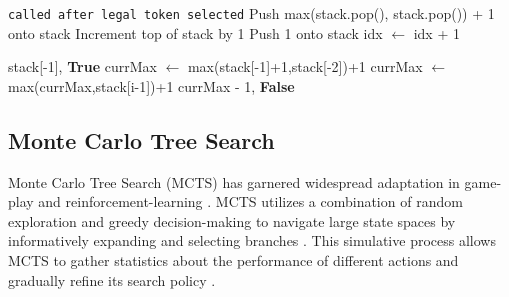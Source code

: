 \documentclass[runningheads]{llncs}
\begin{document}
\begin{algorithm}
\begin{algorithmic}[1]
        \EndIf

    \Else \Comment\texttt{{called after legal token selected}}
            \State Push max(stack.pop(), stack.pop()) + 1 onto stack 
            \State Increment top of stack by 1 
        \Else 
            \State Push 1 onto stack
         \EndIf 
         \State idx $\gets$ idx + 1

             \State \Return stack[-1], \textbf{True}
        \Else
            \State currMax $\gets$ max(stack[-1]+1,stack[-2])+1
                \State currMax $\gets$ max(currMax,stack[i-1])+1
            \EndFor
            \State \Return currMax - 1, \textbf{False}
        \EndIf

    \EndIf
\EndFunction
\end{algorithmic}
\end{algorithm}

\subsection{Monte Carlo Tree Search}\label{subsec:MonteCarlo TreeSearch}

Monte Carlo Tree Search (MCTS) has garnered widespread adaptation in game-play and reinforcement-learning \cite{Silver2016} \cite{Swiechowski2023}. MCTS utilizes a combination of random exploration and greedy decision-making to navigate large state spaces by informatively expanding and selecting branches \cite{Swiechowski2023}. This simulative process allows MCTS to gather statistics about the performance of different actions and gradually refine its search policy \cite{Swiechowski2023}.
\end{document}
